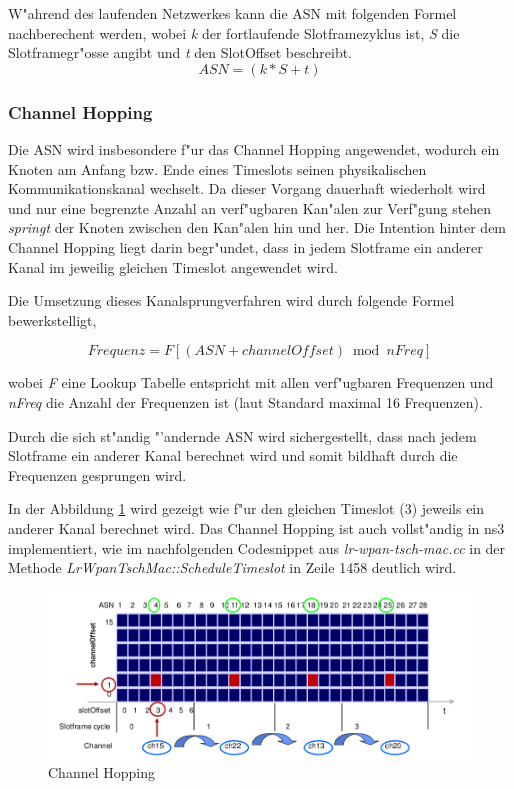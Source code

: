 W"ahrend des laufenden Netzwerkes kann die ASN mit folgenden Formel nachberechent
werden, wobei \textit{k} der fortlaufende Slotframezyklus ist, \textit{S}
die Slotframegr"osse angibt und \textit{t} den SlotOffset beschreibt.
\begin{equation}
ASN = ( k * S + t)
\end{equation}

\subsubsection{Channel Hopping}

Die ASN wird insbesondere f"ur das Channel Hopping angewendet, wodurch ein Knoten
am Anfang bzw. Ende eines Timeslots seinen physikalischen Kommunikationskanal
wechselt. Da dieser Vorgang dauerhaft wiederholt wird und nur eine begrenzte Anzahl
an verf"ugbaren Kan"alen zur Verf"gung stehen \textit{springt} der Knoten zwischen
den Kan"alen hin und her.
Die Intention hinter dem Channel Hopping liegt darin begr"undet, dass in jedem
Slotframe ein anderer Kanal im jeweilig gleichen Timeslot angewendet wird.

Die Umsetzung dieses Kanalsprungverfahren wird durch folgende Formel bewerkstelligt,

\begin{equation}
Frequenz = F[ (ASN + channelOffset) \bmod nFreq]
\end{equation}

wobei \textit{F} eine Lookup Tabelle entspricht mit allen verf"ugbaren Frequenzen und
\textit{nFreq} die Anzahl der Frequenzen ist (laut Standard maximal 16 Frequenzen).

Durch die sich st"andig "'andernde ASN wird sichergestellt, dass nach jedem Slotframe
ein anderer Kanal berechnet wird und somit bildhaft durch die Frequenzen gesprungen
wird.

In der Abbildung \ref{fig:frequency_translation} wird gezeigt wie f"ur den gleichen
Timeslot (3) jeweils ein anderer Kanal berechnet wird. Das Channel Hopping ist auch
vollst"andig in ns3 implementiert, wie im nachfolgenden Codesnippet aus
\textit{lr-wpan-tsch-mac.cc} in der Methode \textit{LrWpanTschMac::ScheduleTimeslot}
in Zeile 1458 deutlich wird.

\begin{figure}[h]
    \centering
    \includegraphics[scale=0.6]{images/frequency_translation.png}
    \caption{Channel Hopping \cite{frequency_translation_fig}}
    \label{fig:frequency_translation}
\end{figure}

